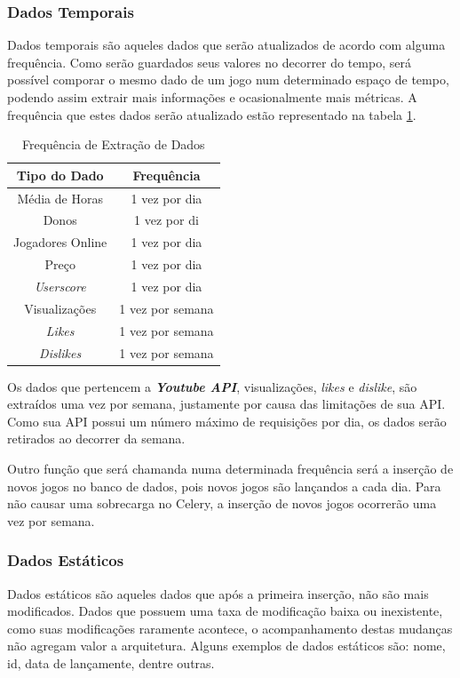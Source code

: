 \subsubsection{Dados Temporais}
Dados temporais são aqueles dados que serão atualizados de acordo com alguma frequência. Como serão guardados seus valores no decorrer do tempo, será possível comporar o mesmo dado de um jogo num determinado espaço de tempo, podendo assim extrair mais informações e ocasionalmente mais métricas. A frequência que estes dados serão atualizado estão representado na tabela \ref{table:frequencia}.
\begin{table} [H]
\centering
\begin{tabular} {c|c}
\textbf{Tipo do Dado}&\textbf{Frequência} \\
\hline Média de Horas&1 vez por dia \\
\hline Donos&1 vez por di \\
\hline Jogadores Online&1 vez por dia \\
\hline Preço&1 vez por dia \\
\hline \textit{Userscore}&1 vez por dia \\
\hline Visualizações&1 vez por semana \\
\hline \textit{Likes}&1 vez por semana \\
\hline \textit{Dislikes}&1 vez por semana \\
\hline 
\end{tabular}
\caption{Frequência de Extração de Dados}
\label{table:frequencia}
\end{table}

Os dados que pertencem a \textit{\textbf{Youtube API}}, visualizações, \textit{likes} e \textit{dislike}, são extraídos uma vez por semana, justamente por causa das limitações de sua API. Como sua API possui um número máximo de requisições por dia, os dados serão retirados ao decorrer da semana.

Outro função que será chamanda numa determinada frequência será a inserção de novos jogos no banco de dados, pois novos jogos são lançandos a cada dia. Para não causar uma sobrecarga no Celery, a inserção de novos jogos ocorrerão uma vez por semana.
\subsubsection{Dados Estáticos}
Dados estáticos são aqueles dados que após a primeira inserção, não são mais modificados. Dados que possuem uma taxa de modificação baixa ou inexistente, como suas modificações raramente acontece, o acompanhamento destas mudanças não agregam valor a arquitetura. Alguns exemplos de dados estáticos são: nome, id, data de lançamente, dentre outras.
